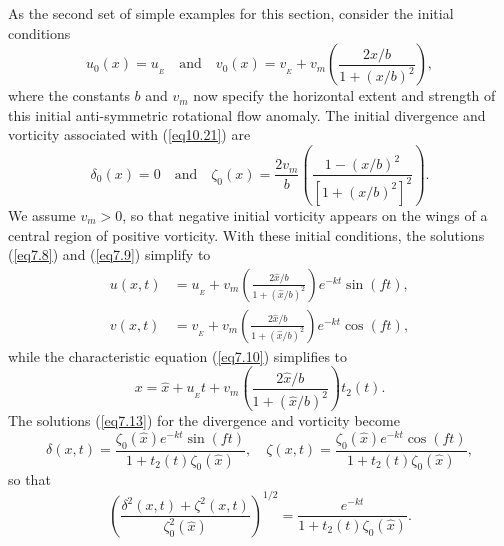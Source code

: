 \documentclass[10pt]{article}
\begin{document}
     As the second set of simple examples for this section, consider the initial
conditions
\begin{equation}                                  %
       u_0(x) = u_{_E}  \quad \text{and} \quad v_0(x) = v_{_E} + v_m \left(\frac{2x/b}{1 + (x/b)^2}\right),
\label{eq10.21}
\end{equation}
where the constants $b$ and $v_m$ now specify the horizontal extent and strength
of this initial anti-symmetric rotational flow anomaly. The initial divergence
and vorticity associated with (\ref{eq10.21}) are
\begin{equation}                                  %
     \delta_0(x) = 0  \quad \text{and} \quad
     \zeta_0(x)  = \frac{2v_m}{b} \left(\frac{1-(x/b)^2}{[1+(x/b)^2]^2}\right).
\label{eq10.22}
\end{equation}
We assume $v_m>0$, so that negative initial vorticity appears on the wings
of a central region of positive vorticity. With these initial conditions, the
solutions (\ref{eq7.8}) and (\ref{eq7.9}) simplify to
\begin{equation}                                  %
  \begin{split}
       u(x,t) &= u_{_E} + v_m\left(\frac{2\hat{x}/b}{1 + (\hat{x}/b)^2}\right)e^{-kt}\sin(ft), \\
       v(x,t) &= v_{_E} + v_m\left(\frac{2\hat{x}/b}{1 + (\hat{x}/b)^2}\right)e^{-kt}\cos(ft),
  \end{split}
\label{eq10.23}
\end{equation}
while the characteristic equation (\ref{eq7.10}) simplifies to
\begin{equation}                                  %
       x = \hat{x} + u_{_E}t + v_m\left(\frac{2\hat{x}/b}{1 + (\hat{x}/b)^2}\right)t_2(t).
\label{eq10.24}
\end{equation}
The solutions (\ref{eq7.13}) for the divergence and vorticity become
\begin{equation}                                  %
       \delta(x,t) = \frac{\zeta_0(\hat{x})e^{-kt}\sin(ft)}{1 + t_2(t)\zeta_0(\hat{x})},   \quad
       \zeta (x,t) = \frac{\zeta_0(\hat{x})e^{-kt}\cos(ft)}{1 + t_2(t)\zeta_0(\hat{x})},
\label{eq10.25}
\end{equation}
so that
\begin{equation}                                    %
        \left(\frac{\delta^2(x,t) + \zeta^2(x,t)}{\zeta_0^2(\hat{x})}\right)^{1/2}
     = \frac{e^{-kt}}{1 + t_2(t)\zeta_0(\hat{x})}.
\label{eq10.26}
\end{equation}
\end{document}
